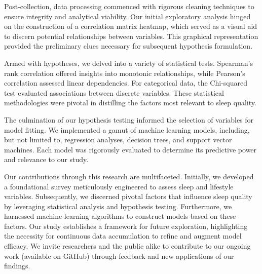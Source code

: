 \documentclass[conference]{IEEEtran}
\begin{document}
Post-collection, data processing commenced with rigorous cleaning techniques to ensure integrity and analytical viability. Our initial exploratory analysis hinged on the construction of a correlation matrix heatmap, which served as a visual aid to discern potential relationships between variables. This graphical representation provided the preliminary clues necessary for subsequent hypothesis formulation.

Armed with hypotheses, we delved into a variety of statistical tests. Spearman's rank correlation offered insights into monotonic relationships, while Pearson's correlation assessed linear dependencies. For categorical data, the Chi-squared test\cite{chi} evaluated associations between discrete variables. These statistical methodologies were pivotal in distilling the factors most relevant to sleep quality.

The culmination of our hypothesis testing informed the selection of variables for model fitting. We implemented a gamut of machine learning models, including, but not limited to, regression analyses, decision trees, and support vector machines. Each model was rigorously evaluated to determine its predictive power and relevance to our study.

Our contributions through this research are multifaceted. Initially, we developed a foundational survey meticulously engineered to assess sleep and lifestyle variables. Subsequently, we discerned pivotal factors that influence sleep quality by leveraging statistical analysis and hypothesis testing. Furthermore, we harnessed machine learning algorithms to construct models based on these factors. Our study establishes a framework for future exploration, highlighting the necessity for continuous data accumulation to refine and augment model efficacy. We invite researchers and the public alike to contribute to our ongoing work (available on GitHub\footnotemark) through feedback and new applications of our findings.
\end{document}
